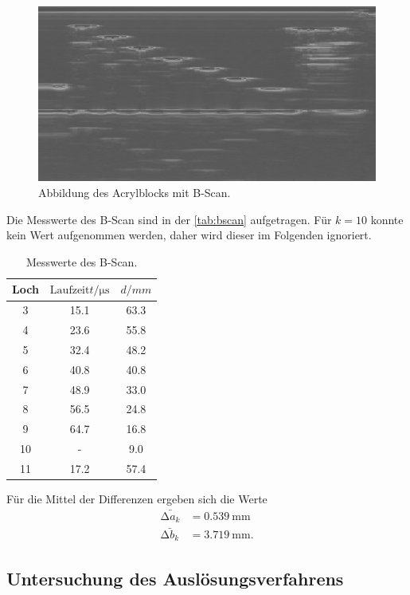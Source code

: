 \begin{figure}[H]
    \centering
	\includegraphics[width=0.8\linewidth]{data/US1_daten/b_scan_u.jpg}
    \captionsetup{width=0.765\linewidth}
	\caption{Abbildung des Acrylblocks mit B-Scan.}
	\label{fig:unten}
\end{figure}

Die Messwerte des B-Scan sind in der \autoref{tab:bscan} aufgetragen. Für $k =10$ konnte kein Wert aufgenommen werden, daher wird dieser
im Folgenden ignoriert.
\begin{table}[H]
    \centering
    \caption{Messwerte des B-Scan.}
    \label{tab:bscan}
\begin{tabular}{c c c}
\toprule
Loch & $\text{Laufzeit} t / \si{\micro\second} $& $ d/ \si{mm}$\\
\midrule
 3 & 15.1 & 63.3 \\
 4 & 23.6 & 55.8 \\
 5 & 32.4 & 48.2 \\
 6 & 40.8 & 40.8 \\
 7 & 48.9 & 33.0 \\
 8 & 56.5 & 24.8 \\
 9 & 64.7 & 16.8 \\
10 & - &  9.0 \\
11 & 17.2 & 57.4 \\
\bottomrule
\end{tabular}
\end{table}

Für die Mittel der Differenzen ergeben sich die Werte
\begin{align*}
\bar{\increment a_k} &= \SI{0.539}{\milli\meter} \\
\bar{\increment b_k} &= \SI{3.719}{\milli\meter}.
\end{align*}

\subsection{Untersuchung des Auslösungsverfahrens} %
\label{sec:Untersuchung des Auslösungsverfahrens}

